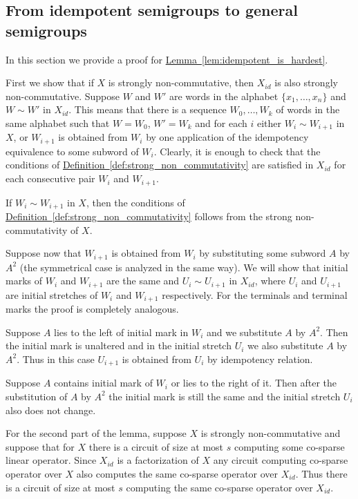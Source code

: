 \documentclass[11pt]{article}
\numberwithin{equation}{section}
\theoremstyle{definition}
\theoremstyle{plain}
\newcommand{\expref}[2]{\hyperref[#2]{#1~\ref{#2}}}
\theoremstyle{plain}\newtheorem{observation}[theorem]{Observation}
\begin{document}
\subsection{From idempotent semigroups to general semigroups}\label{sec:noncommutative_extension}

In this section we provide a proof for \expref{Lemma}{lem:idempotent_is_hardest}.


First we show that if $X$ is strongly non-commutative, then $X_{id}$ is also strongly non-commutative.
Suppose $W$ and $W'$ are words in the alphabet $\{x_1,\ldots, x_n\}$ and $W \sim W'$ in $X_{id}$. This means that there is a sequence $W_0,\ldots, W_k$ of words in the same alphabet such that $W=W_0$, $W'=W_k$ and for each $i$ either $W_i \sim W_{i+1}$ in $X$, or $W_{i+1}$ is obtained from $W_i$ by one application of the idempotency equivalence to some subword of $W_i$. Clearly, it is enough to check that the conditions of \expref{Definition}{def:strong_non_commutativity} are satisfied in $X_{id}$ for each consecutive pair $W_i$ and $W_{i+1}$.

If $W_i \sim W_{i+1}$ in $X$, then the conditions of \expref{Definition}{def:strong_non_commutativity} follows from the strong non-commutativity of $X$.

Suppose now that $W_{i+1}$ is obtained from $W_{i}$ by substituting some subword $A$ by $A^2$ (the symmetrical case is analyzed in the same way). We will show that initial marks of $W_i$ and $W_{i+1}$ are the same and $U_{i} \sim U_{i+1}$ in $X_{id}$, where $U_{i}$ and $U_{i+1}$ are
%
%
initial stretches %
of $W_i$ and $W_{i+1}$ respectively. For the terminals and terminal marks the proof is completely analogous.

Suppose $A$ lies to the left of initial mark in $W_i$ and we substitute $A$ by $A^2$. Then the initial mark is unaltered and in the
%
%
initial stretch %
$U_i$ we also substitute $A$ by $A^2$. Thus in this case $U_{i+1}$ is obtained from $U_i$ by idempotency relation.

Suppose $A$ contains initial mark of $W_i$ or lies to the right of it. Then after the substitution of $A$ by $A^2$ the initial mark is still the same and the
%
%
initial stretch %
$U_i$ also does not change.


For the second part of the lemma, suppose $X$ is strongly non-commutative and suppose that for $X$ there is a circuit of size at most $s$ computing some
%
%
co-sparse
 linear operator.
Since $X_{id}$ is a factorization of $X$ any circuit computing
%
%
co-sparse
operator over $X$ also computes the same
%
%
co-sparse
operator over $X_{id}$. Thus there is a  circuit of size at most $s$ computing the same
%
%
co-sparse
operator over $X_{id}$.
%
%
\end{document}
